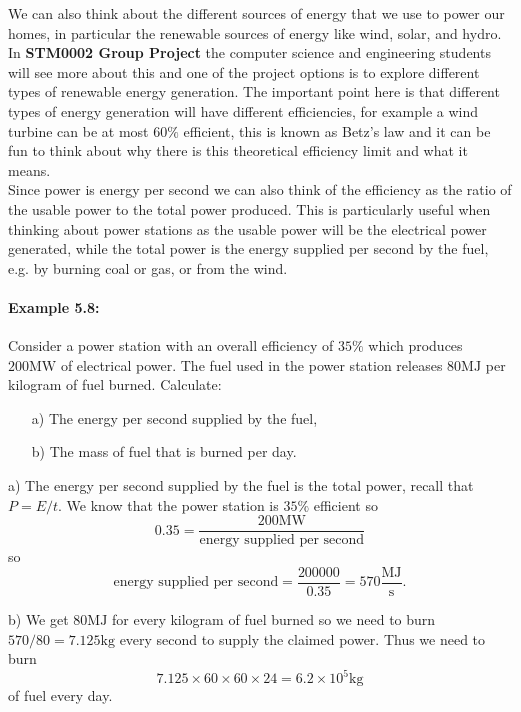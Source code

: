 \documentclass[a4paper,12pt]{book}
\begin{document}
We can also think about the different sources of energy that we use to power our homes, in particular the renewable sources of energy like wind, solar, and hydro. In \textbf{STM0002 Group Project} the computer science and engineering students will see more about this and one of the project options is to explore different types of renewable energy generation. The important point here is that different types of energy generation will have different efficiencies, for example a wind turbine can be at most $60\%$ efficient, this is known as Betz's law and it can be fun to think about why there is this theoretical efficiency limit and what it means.\\

Since power is energy per second we can also think of the efficiency as the ratio of the usable power to the total power produced. This is particularly useful when thinking about power stations as the usable power will be the electrical power generated, while the total power is the energy supplied per second by the fuel, e.g. by burning coal or gas, or from the wind.

\paragraph{Example 5.8:} Consider a power station with an overall efficiency of $35\%$ which produces $200\text{MW}$ of electrical power. The fuel used in the power station releases $80\text{MJ}$ per kilogram of fuel burned. Calculate:
\begin{itemize}
\setlength{\itemsep}{-5pt}
    \item[a)] The energy per second supplied by the fuel,
    \item[b)] The mass of fuel that is burned per day.
\end{itemize} 

a) The energy per second supplied by the fuel is the total power, recall that $P=E/t$. We know that the power station is $35\%$ efficient so
\begin{equation*}
0.35=\frac{200\text{MW}}{\text{energy supplied per second}}
\end{equation*}
so
\begin{equation*}
\text{energy supplied per second}=\frac{200000}{0.35}=570\frac{\text{MJ}}{\text{s}}.
\end{equation*}

b) We get $80\text{MJ}$ for every kilogram of fuel burned so we need to burn $570/80=7.125\text{kg}$ every second to supply the claimed power. Thus we need to burn 
\begin{equation*}
7.125\times 60\times 60\times 24=6.2\times10^{5}\text{kg}
\end{equation*}
of fuel every day.
\end{document}
